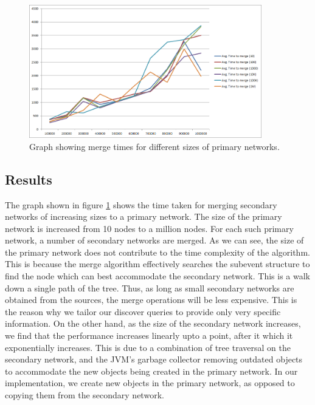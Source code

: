 \begin{figure}[t]
\centering
\includegraphics[width=0.9\textwidth]{media/chapter5/perf/mergebignodetest.png}
\caption{Graph showing merge times for different sizes of primary networks.}
\label{fig:agg-merge-tests}
\end{figure}

\subsection{Results}
The graph shown in figure \ref{fig:agg-merge-tests} shows the time taken for merging secondary networks of increasing sizes to a primary network. The size of the primary network is increased from 10 nodes to a million nodes. For each such primary network, a number of secondary networks are merged. As we can see, the size of the primary network does not contribute to the time complexity of the algorithm. This is because the merge algorithm effectively searches the subevent structure to find the node which can best accommodate the secondary network. This is a walk down a single path of the tree. Thus, as long as small secondary networks are obtained from the sources, the merge operations will be less expensive. This is the reason why we tailor our discover queries to provide only very specific information. On the other hand, as the  size of the secondary network increases, we find that the performance increases linearly upto a point, after it which it exponentially increases. This is due to a combination of tree traversal on the secondary network, and the JVM's garbage collector removing outdated objects to accommodate the new objects being created in the primary network. In our implementation, we create new objects in the primary network, as opposed to copying them from the secondary network.

